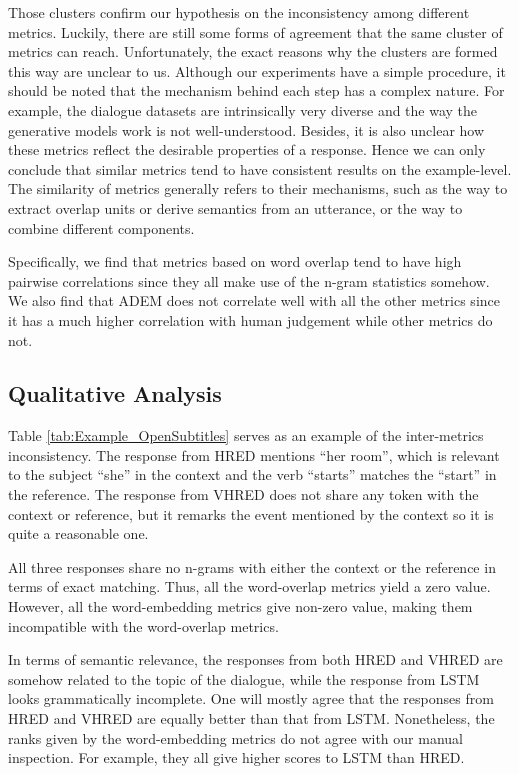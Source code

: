 \documentclass[runningheads]{llncs}
\begin{document}
    Those clusters confirm our hypothesis on the inconsistency among different metrics. Luckily, there are still some forms of agreement that the same cluster of metrics can reach. Unfortunately, the exact reasons why the clusters are formed this way are unclear to us. Although our experiments have a simple procedure, it should be noted that the mechanism behind each step has a complex nature. For example, the dialogue datasets are intrinsically very diverse and the way the generative models work is not well-understood. Besides, it is also unclear how these metrics reflect the desirable properties of a response. Hence we can only conclude that similar metrics tend to have consistent results on the example-level. The similarity of metrics generally refers to their mechanisms, such as the way to extract overlap units or derive semantics from an utterance, or the way to combine different components.

    Specifically, we find that metrics based on word overlap tend to have high pairwise correlations since they all make use of the n-gram statistics somehow. We also find that ADEM does not correlate well with all the other metrics since it has a much higher correlation with human judgement while other metrics do not.

    \subsection{Qualitative Analysis}
    
    Table \ref{tab:Example_OpenSubtitles} serves as an example of the inter-metrics inconsistency. The response from HRED mentions ``her room'', which is relevant to the subject ``she'' in the context and the verb ``starts'' matches the ``start'' in the reference. The response from VHRED does not share any token with the context or reference, but it remarks the event mentioned by the context so it is quite a reasonable one.

    All three responses share no n-grams with either the context or the reference in terms of exact matching. Thus, all the word-overlap metrics yield a zero value. However, all the word-embedding metrics give non-zero value, making them incompatible with the word-overlap metrics.

    In terms of semantic relevance, the responses from both HRED and VHRED are somehow related to the topic of the dialogue, while the response from LSTM looks grammatically incomplete. One will mostly agree that the responses from HRED and VHRED are equally better than that from LSTM. Nonetheless, the ranks given by the word-embedding metrics do not agree with our manual inspection. For example, they all give higher scores to LSTM than HRED.
\end{document}
